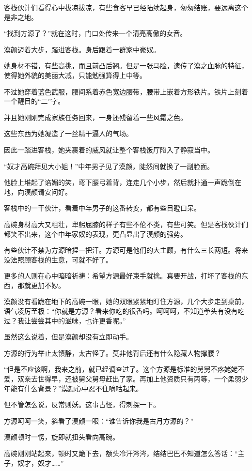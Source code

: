 \begin{this_body}
客栈伙计们看得心中拔凉拔凉，有些食客早已经陆续起身，匆匆结账，要远离这个是非之地。

“找到方源了？”就在这时，门口处传来一个清亮高傲的女音。

漠颜迈着大步，踏进客栈。身后跟着一群家中豪奴。

她身材不错，有些高挑，而且前凸后翘。但是一张马脸，遗传了漠之血脉的特征，使得她外貌的美丽大减，只能勉强算得上中等。

不过她穿着蓝色武服，腰间系着赤色宽边腰带，腰带上嵌着方形铁片。铁片上刻着一个醒目的“二”字。

并且她刚刚完成家族任务回来，一身还残留着一些风霜之色。

这些东西为她凝造了一丝精干逼人的气场。

因此一踏进客栈，她夹裹着的威风就让整个客栈饭厅陷入了静寂当中。

“奴才高碗拜见大小姐！”中年男子见了漠颜，陡然间就换了一副脸面。

他脸上堆起了谄媚的笑，弯下腰弓着背，连走几个小步，然后就扑通一声跪倒在地，向漠颜请安问好。

客栈中的一干伙计，看着中年男子的这番转变，都有些目瞪口呆。

高碗身材高大又粗壮，卑躬屈膝的样子有些不伦不类，有些可笑。但是客栈伙计们都笑不出来，这个中年家奴的表现，更凸显出了漠颜的强势。

有些伙计不禁为方源暗捏一把汗。方源可是他们的大主顾，有什么三长两短。将来没法照顾客栈的生意，可就不好了。

更多的人则在心中暗暗祈祷：希望方源最好束手就擒。真要开战，打坏了客栈的东西，那就更加不妙。

漠颜没有看跪在地下的高碗一眼，她的双眼紧紧地盯住方源，几个大步走到桌前，语气凌厉至极：“你就是方源？看来你吃的很香吗。呵呵呵，不知道拳头有没有吃过？我让尝尝其中的滋味，也许更香呢。”

虽然这么说着，但是漠颜却没有立即动手。

方源的行为举止太镇静，太古怪了。莫非他背后还有什么隐藏人物撑腰？

“但是不应该啊，我来之前，就已经调查过了。这个方源是标准的舅舅不疼姥姥不爱，双亲去世得早，还被舅父舅母赶出了家。再加上他资质只有丙等，一个柔弱少年能有什么背景？”漠颜心中忍不住嘀咕起来。

但不管怎么说，反常则妖。这事古怪，得刺探一下。

方源呵呵一笑，斜看了漠颜一眼：“谁告诉你我是古月方源的？”

漠颜顿时一愣，旋即就扭头看向高碗。

高碗刚刚站起来，顿时又跪下去，额头冷汗涔涔，结结巴巴不知道怎么答话：“主子，奴才，奴才……”


\end{this_body}
